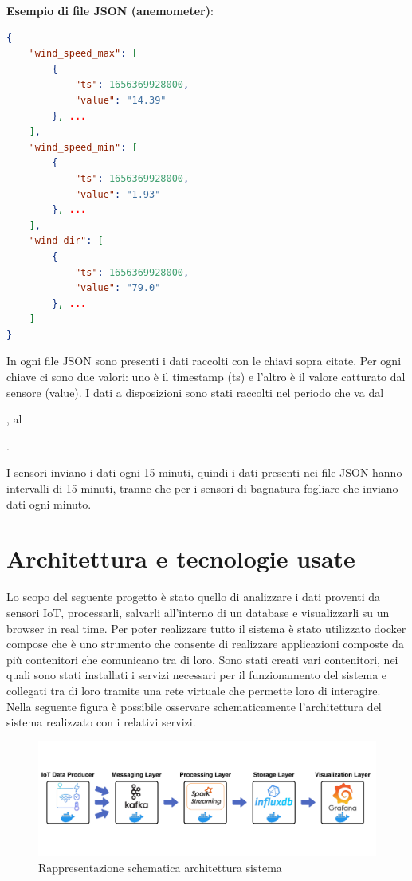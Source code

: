 \documentclass{article}
\begin{document}
\textbf{Esempio di file JSON (anemometer)}:
\begin{lstlisting}[language=json,firstnumber=1]
{
    "wind_speed_max": [
        {
            "ts": 1656369928000,
            "value": "14.39"
        }, ...
    ],
    "wind_speed_min": [
        {
            "ts": 1656369928000,
            "value": "1.93"
        }, ...
    ],
    "wind_dir": [
        {
            "ts": 1656369928000,
            "value": "79.0"
        }, ...
    ]
}
\end{lstlisting}

In ogni file JSON sono presenti i dati raccolti con le chiavi sopra citate. Per ogni chiave ci sono due valori: uno è il timestamp (ts) e l'altro è il valore catturato dal sensore (value). I dati a disposizioni sono stati raccolti nel periodo che va dal \date{01/04/2022}, al \date{27/06/2022}. 

I sensori inviano i dati ogni 15 minuti, quindi i dati presenti nei file JSON hanno intervalli di 15 minuti, tranne che per i sensori di bagnatura fogliare che inviano dati ogni minuto.

\newpage
\section{Architettura e tecnologie usate}
Lo scopo del seguente progetto è stato quello di analizzare i dati proventi da sensori IoT, processarli, salvarli all'interno di un database e visualizzarli su un browser in real time.
Per poter realizzare tutto il sistema è stato utilizzato docker compose che è uno strumento che consente di realizzare applicazioni composte da più contenitori che comunicano tra di loro. Sono stati creati vari contenitori, nei quali sono stati installati i servizi necessari per il funzionamento del sistema e collegati tra di loro tramite una rete virtuale che permette loro di interagire.
Nella seguente figura è possibile osservare schematicamente l'architettura del sistema realizzato con i relativi servizi.

\begin{figure}[H]
\includegraphics[width=1\linewidth]{Schema-Architettura-1}
\centering
\caption*{Rappresentazione schematica architettura sistema}
\label{fig:bytepost}
\end{figure}
\end{document}
